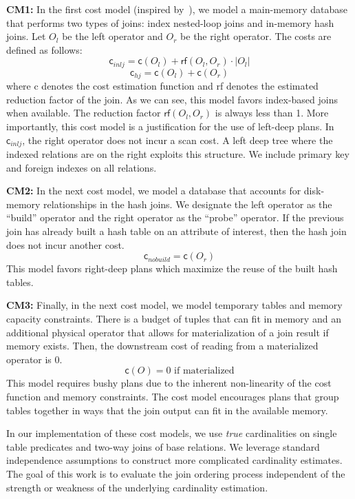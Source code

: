 \vspace{0.25em} \noindent \textbf{CM1: } In the first cost model (inspired by~\cite{leis2015good}), we model a main-memory database that performs two types of joins: index nested-loop joins and in-memory hash joins. Let $O_l$ be the left operator and $O_r$ be the right operator. The costs are defined as follows:
\[
\textsf{c}_{inlj} = \textsf{c}(O_l) + \textsf{rf}(O_l, O_r) \cdot |O_l|
\]
\[
\textsf{c}_{hj} = \textsf{c}(O_l) + \textsf{c}(O_r)
\]
where \textsf{c} denotes the cost estimation function and \textsf{rf} denotes the estimated reduction factor of the join.
As we can see, this model favors index-based joins when available. 
The reduction factor $\textsf{rf}(O_l, O_r)$ is always less than 1.
More importantly, this cost model is a justification for the use of left-deep plans.
In $\textsf{c}_{inlj}$, the right operator does not incur a scan cost.
A left deep tree where the indexed relations are on the right exploits this structure. We include primary key and foreign indexes on all relations.


\vspace{0.25em} \noindent \textbf{CM2: } In the next cost model, we model a database that accounts for disk-memory relationships in the hash joins. We designate the left operator as the ``build'' operator and the right operator as the ``probe'' operator. 
If the previous join has already built a hash table on an attribute of interest, then the hash join does not incur another cost.
\[
\textsf{c}_{nobuild} = \textsf{c}(O_r)
\]
This model favors right-deep plans which maximize the reuse of the built hash tables.


\vspace{0.25em} \noindent \textbf{CM3: } Finally, in the next cost model, we model temporary tables and memory capacity constraints. There is a budget of tuples that can fit in memory and an additional physical operator that allows for materialization of a join result if memory exists. Then, the downstream cost of reading from a materialized operator is 0.   
\[
\textsf{c}(O) = 0 \text{ if materialized}
\]
This model requires bushy plans due to the inherent non-linearity of the cost function and memory constraints. 
The cost model encourages plans that group tables together in ways that the join output can fit in the available memory.

\vspace{0.5em} In our implementation of these cost models, we use \emph{true} cardinalities on single table predicates and two-way joins of base relations. We leverage standard independence assumptions to construct more complicated cardinality estimates. The goal of this work is to evaluate the join ordering process independent of the strength or weakness of the underlying cardinality estimation. 

